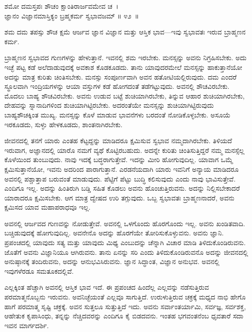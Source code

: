 \begin{shloka}
ಶಮೋ ದಮಸ್ತಪಃ ಶೌಚಂ ಕ್ಷಾಂತಿರಾರ್ಜವಮೇವ ಚ~।\\ಜ್ಞಾನಂ ವಿಜ್ಞಾನಮಾಸ್ತಿಕ್ಯಂ ಬ್ರಹ್ಮಕರ್ಮ ಸ್ವಭಾವಜಮ್ \hfill॥ ೪೨~॥
\end{shloka}

\begin{artha}
ಶಮ ದಮ ತಪಸ್ಸು ಶೌಚ ಕ್ಷಮೆ ಆರ್ಜವ ಜ್ಞಾನ ವಿಜ್ಞಾನ ಮತ್ತು ಆಸ್ತಿಕ ಭಾವ—ಇವು ಸ್ವಭಾವತಃ ಇರುವ ಬ್ರಾಹ್ಮಣನ ಕರ್ಮ.
\end{artha}

ಬ್ರಾಹ್ಮಣನ ಸ್ವಭಾವದ ಗುಣಗಳನ್ನು ಹೇಳುತ್ತಾನೆ. ಇವನಲ್ಲಿ ಶಮ ಇರಬೇಕು. ಮನಸ್ಸನ್ನು ಅವನು ನಿಗ್ರಹಿಸಬೇಕು. ಅದು ಇಚ್ಛೆ ಪಟ್ಟ ಕಡೆ ಅಲೆದಾಡುವುದಕ್ಕೆ ಅವಕಾಶ ಕೊಡಕೂಡದು. ತಾನು ಯಾವುದರಮೇಲೆ ಮನಸ್ಸನ್ನು ಹಾಕುತ್ತಾನೆಯೋ ಅದನ್ನು ಮಾತ್ರ ಕುರಿತು ಚಿಂತಿಸಬೇಕು. ಮನಸ್ಸು ಸಂಪೂರ್ಣವಾಗಿ ಅವನ ಹತೋಟಿಯಲ್ಲಿರುವುದು. ದಮ ಎಂದರೆ ಸ್ಥೂಲವಾಗಿ ಇಂದ್ರಿಯಗಳನ್ನು ಆಯಾ ವಸ್ತುಗಳ ಕಡೆ ಹೋಗದಂತೆ ತಡೆಗಟ್ಟುವುದು. ಅವನಲ್ಲಿ ಶೌಚವಿರಬೇಕು. ಮೊದಲು ಬಾಹ್ಯ ಶೌಚವಿರಬೇಕು. ಅವನು ಉಡುವ ಬಟ್ಟೆ ಶುಚಿಯಾಗಿರಬೇಕು, ತಿನ್ನುವ ಆಹಾರ ಶುಚಿಯಾಗಿರಬೇಕು, ದೇಹವನ್ನು ಸ್ನಾನಾದಿಗಳಿಂದ ಶುಚಿಯಾಗಿಟ್ಟಿರಬೇಕು. ಅದರಂತೆಯೇ ಮನಸ್ಸನ್ನು ಶುಚಿಯಾಗಿಟ್ಟಿರುವುದು ಬಾಹ್ಯಶೌಚಕ್ಕಿಂತ ಮುಖ್ಯ. ಮನಸ್ಸನ್ನು ಕೊಳೆ ಮಾಡುವ ಭಾವನೆಗಳು ಬರದಂತೆ ನೋಡಿಕೊಳ್ಳಬೇಕು. ಅಸೂಯೆ ಇರಕೂಡದು, ಸುಳ್ಳು ಹೇಳಕೂಡದು, ಶಾಂತನಾಗಿರಬೇಕು.

ಜೀವನದಲ್ಲಿ ತನಗೆ ಯಾರು ಎಂತಹ ಕೆಟ್ಟದ್ದನ್ನು ಮಾಡಿದರೂ ಕ್ಷಮಿಸುವ ಸ್ವಭಾವ ನಮ್ಮದಾಗಿರಬೇಕು. ತಿಳಿಯದೆ ಇರುವಾಗ, ಅಜ್ಞಾನದಲ್ಲಿ ಯಾರೊ ನಮಗೆ ವ್ಯಥೆ ಕೊಟ್ಟಿರಬಹುದು. ಅದನ್ನೇ ಕುರಿತು ಚಿಂತಿಸುತ್ತಿದ್ದರೆ ನಮ್ಮ ಮನಸ್ಸೆಲ್ಲ ಕೊಳೆಯಿಂದ ತುಂಬುವುದು. ನಾವು ಇದಕ್ಕೆ ಬದ್ಧರಾಗುತ್ತೇವೆ. ಇದನ್ನು ಮೀರಿ ಹೋಗುವುದಿಲ್ಲ. ಯಾವಾಗ ಒಮ್ಮೆ ಕ್ಷಮಿಸುತ್ತಾನೆಯೋ, ಇವನು ಅದರಿಂದ ಪಾರಾಗುತ್ತಾನೆ. ಎರಡನೆಯದಾಗಿ ಯಾರು ಇವನಿಗೆ ಅನ್ಯಾಯ ಮಾಡಿದರೂ ಅವನಲ್ಲಿ ಪಶ್ಚಾತ್ತಾಪ ಬರುವಂತೆ ಮಾಡುವುದು. ಪೆಟ್ಟಿಗೆ ಪೆಟ್ಟು ಬುದ್ಧಿ ಕಲಿಸುವುದು ಎಂದು ನಾವು ಭಾವಿಸುತ್ತೇವೆ. ಎಂದಿಗೂ ಇಲ್ಲ. ಅದನ್ನು ಹಿಂತಿರುಗಿ ಬಡ್ಡಿ ಸಹಿತ ಕೊಡಲು ಅವನು ಹೊಂಚುತ್ತಿರುವನು. ಅದನ್ನು ನಿಲ್ಲಿಸಬೇಕಾದರೆ ಯಾರಾದರೂ ಕ್ಷಮಿಸಬೇಕು. ಆಗ ಮಾತ್ರ ದ್ವೇಷದ ಉರಿ ತಗ್ಗುವುದು. ಒಬ್ಬ ಸ್ವಭಾವತಃ ಬ್ರಾಹ್ಮಣನಾದರೆ, ಅವನು ಕ್ಷಮಿಸದ ಯಾವ ಮಹಾಪರಾಧವೂ ಇಲ್ಲ.

\newpage

ಅವನಲ್ಲಿ ಆರ್ಜವದ ಗುಣವನ್ನು ನೋಡುತ್ತೇವೆ. ಅವನಲ್ಲಿ ಒಳಗೊಂದು ಹೊರಗೊಂದು ಇಲ್ಲ. ಅವನು ಖಂಡಿತವಾದಿ. ಬಚ್ಚಿಡುವುದಕ್ಕೆ ಹೋಗುವುದಿಲ್ಲ. ಅವನೇನೊ ಅದನ್ನು ಹೊರಗೆಯೇ ತೋರಿಸುಕೊಳ್ಳುವನು. ಅವನು ಜ್ಞಾನಿ. ಪ್ರಪಂಚದಲ್ಲಿ ಯಾವುದು ಸತ್ಯ ಮತ್ತು ಯಾವುದು ಮಿಥ್ಯ ಎಂಬುದನ್ನು ಚೆನ್ನಾಗಿ ವಿಚಾರ ಮಾಡಿ ತಿಳಿದುಕೊಂಡಿರುವನು. ಜೊತೆಗೆ ಅವನು ವಿಜ್ಞಾನಿಯೂ ಆಗಿರುವನು. ತಾನು ಏನನ್ನು ಸರಿ ಎಂದು ತಿಳಿದುಕೊಂಡಿರುವನೊ ಅದನ್ನು ಜೀವನದಲ್ಲಿ ಅನುಷ್ಠಾನಕ್ಕೆ ತಂದಿರುವನು, ಅದನ್ನು ಆನುಭವಿಸಿರುವನು. ಜ್ಞಾನ ಸಿದ್ಧಾಂತ, ವಿಜ್ಞಾನ ಅನುಭವ. ಅವನಲ್ಲಿ ಇವುಗಳೆರಡೂ ಸಮತೂಕದಲ್ಲಿವೆ.

ಎಲ್ಲಕ್ಕಿಂತ ಹೆಚ್ಚಾಗಿ ಅವನಲ್ಲಿ ಆಸ್ತಿಕ ಭಾವ ಇದೆ. ಈ ಪ್ರಪಂಚದ ಹಿಂದೆಲ್ಲ ಎಲ್ಲವನ್ನು ನಡೆಸುತ್ತಿರುವ ಪರಮಾತ್ಮನೊಬ್ಬನು ಇರುವನು. ಅವನಿಚ್ಛೆಯಂತೆ ಎಲ್ಲವೂ ಸಾಗುತ್ತಿದೆ. ಉರುಳು\-ತ್ತಿರುವ ಚಕ್ರಕ್ಕೆ ಮಧ್ಯದ ನಾಭಿ ಹೇಗೊ ಹಾಗೆ ಪರಮಾತ್ಮ ಸೃಷ್ಟಿ ಚಕ್ರಕ್ಕೆ. ಅವನ ಸುತ್ತಲೂ ಸುತ್ತುತ್ತಿದೆ ಇದು. ಅವನು ಸರ್ವಾಂತರ್ಯಾಮಿ, ಸರ್ವಜ್ಞ, ಸರ್ವಶಕ್ತ, ಆಹೇತುಕ ಕೃಪಾಸಿಂಧು, ತನ್ನನ್ನು ನೆಚ್ಚಿದವರನ್ನು ಎಂದಿಗೂ ಕೈ ಬಿಡದವನು. ಇಂತಹ ಭಗವಂತನೆಂಬ ಧೃವತಾರೆ ಸದಾ ಇವನ ಮಾರ್ಗದರ್ಶಿ.

